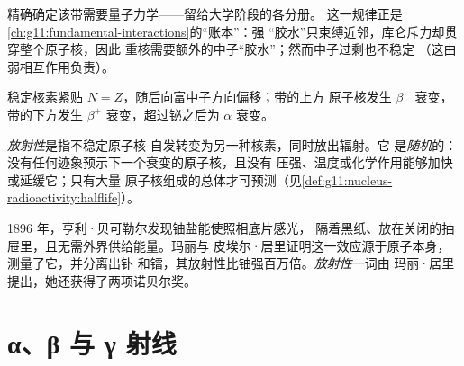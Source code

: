 \begin{remark}
精确确定该带需要量子力学——留给大学阶段的各分册。
这一规律正是\cref{ch:g11:fundamental-interactions}的“账本”：强
“胶水”只束缚近邻，库仑斥力却贯穿整个原子核，因此
重核需要额外的中子“胶水”；然而中子过剩也不稳定
（这由弱相互作用负责）。
\end{remark}

\begin{omfigure}

{\small 稳定核素紧贴 $N = Z$，随后向富中子方向偏移；带的上方
原子核发生 $\beta^-$ 衰变，带的下方发生 $\beta^+$ 衰变，超过铋之后为 $\alpha$ 衰变。}
\end{omfigure}

\begin{definition}[放射性]\label{def:g11:nucleus-radioactivity:radioactivity}
\emph{放射性}是指不稳定原子核
自发转变为另一种核素，同时放出辐射。它
是\emph{随机}的：没有任何迹象预示下一个衰变的原子核，且没有
压强、温度或化学作用能够加快或延缓它；只有大量
原子核组成的总体才可预测（见\cref{def:g11:nucleus-radioactivity:halflife}）。
\end{definition}

\begin{remark}[贝可勒尔与居里夫妇]\label{rem:g11:nucleus-radioactivity:curie}
1896 年，亨利·贝可勒尔发现铀盐能使照相底片感光，
隔着黑纸、放在关闭的抽屉里，且无需外界供给能量。玛丽与
皮埃尔·居里证明这一效应源于原子本身，测量了它，并分离出钋
和镭，其放射性比铀强百万倍。\emph{放射性}一词由
玛丽·居里提出，她还获得了两项诺贝尔奖。
\end{remark}

\section{α、β 与 γ 射线}

